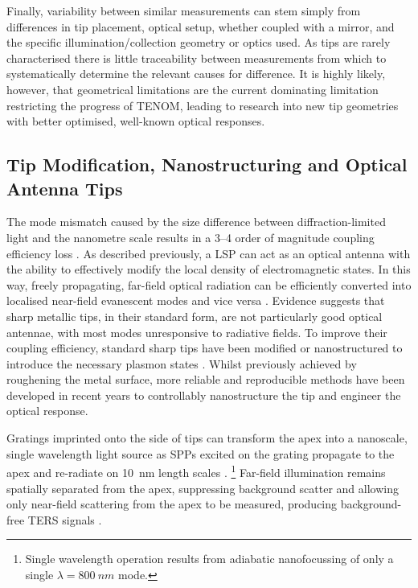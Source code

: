 \documentclass{article}
\begin{document}
Finally, variability between similar measurements can stem simply from differences in tip placement, optical setup, whether coupled with a mirror, and the specific illumination/collection geometry or optics used. As tips are rarely characterised there is little traceability between measurements from which to systematically determine the relevant causes for difference. It is highly likely, however, that geometrical limitations are the current dominating limitation restricting the progress of TENOM, leading to research into new tip geometries with better optimised, well-known optical responses.

\subsection{Tip Modification, Nanostructuring and Optical Antenna Tips}

The mode mismatch caused by the size difference between diffraction-limited light and the nanometre scale results in a 3--4 order of magnitude coupling efficiency loss \cite{berweger2010}. As described previously, a LSP can act as an optical antenna with the ability to effectively modify the local density of electromagnetic states. In this way, freely propagating, far-field optical radiation can be efficiently converted into localised near-field evanescent modes and vice versa \cite{novotny2006, novotny2011}. Evidence suggests that sharp metallic tips, in their standard form, are not particularly good optical antennae, with most modes unresponsive to radiative fields. To improve their coupling efficiency, standard sharp tips have been modified or nanostructured to introduce the necessary plasmon states \cite{mauser2014}. Whilst previously achieved by roughening the metal surface, more reliable and reproducible methods have been developed in recent years to controllably nanostructure the tip and engineer the optical response.

Gratings imprinted onto the side of tips can transform the apex into a nanoscale, single wavelength light source as SPPs excited on the grating propagate to the apex and re-radiate on \SI{10}{nm} length scales \cite{ropers2007, neacsu2010}.%
\footnote{Single wavelength operation results from adiabatic nanofocussing of only a single $\lambda=\SI{800}{nm}$ mode.}
Far-field illumination remains spatially separated from the apex, suppressing background scatter and allowing only near-field scattering from the apex to be measured, producing background-free TERS signals \cite{berweger2010, berweger2012}.
\end{document}
